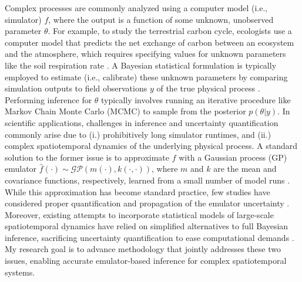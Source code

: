 \documentclass[11pt]{article}
\begin{document}
Complex processes are commonly analyzed using a computer model (i.e., simulator) $f$, where the output is a function of some unknown, unobserved parameter $\theta$.
For example, to study the terrestrial carbon cycle, ecologists use a computer model 
that predicts the net exchange of carbon between an ecosystem and the atmosphere, which requires specifying values for unknown parameters like the soil respiration rate \cite{Fer}.
A Bayesian statistical formulation is typically employed to estimate (i.e., calibrate) these unknown parameters by comparing simulation outputs to field observations $y$ of the true physical process \cite{Kennedy}. Performing inference for $\theta$ typically involves running an iterative procedure like Markov Chain Monte Carlo (MCMC) to sample from the posterior $p(\theta|y)$. In scientific applications, challenges in inference and uncertainty quantification commonly arise due to (i.) prohibitively long simulator runtimes, and (ii.) complex spatiotemporal dynamics of the underlying physical process. A standard solution to the former issue is to approximate $f$ with a Gaussian process (GP) emulator $\hat{f}(\cdot) \sim \mathcal{GP}(m(\cdot), k(\cdot, \cdot))$, where $m$ and $k$ are the mean and covariance functions, respectively, learned from a small number of model runs \cite{Fer, Kennedy, Cleary}. While this approximation has become standard practice, few studies have considered proper quantification and propagation of the emulator uncertainty \cite{Fer, Cleary}. Moreover, existing attempts to incorporate statistical models of large-scale spatiotemporal dynamics have relied on simplified alternatives to full Bayesian inference, sacrificing uncertainty quantification to ease computational demands \cite{Sun}.
My research goal is to advance methodology that jointly addresses these two issues, enabling accurate emulator-based inference for complex spatiotemporal systems. 

\end{document}
